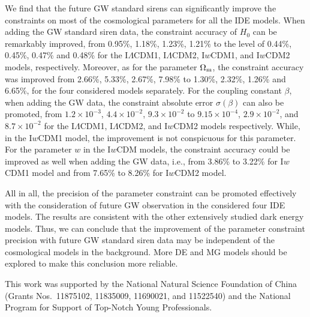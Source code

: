 \documentclass[aps,prd,nofootinbib,amsmath,amssymb,superscriptaddress,twocolumn,10pt]{revtex4}%
\begin{document}
We find that the future GW standard sirens can significantly improve the constraints on most of the cosmological parameters for all the IDE models. When adding the GW standard siren data, the constraint accuracy of $H_0$ can be remarkably improved, from 0.95\%, 1.18\%, 1.23\%, 1.21\% to the level of 0.44\%, 0.45\%, 0.47\% and 0.48\% for the I$\Lambda$CDM1, I$\Lambda$CDM2, I$w$CDM1, and I$w$CDM2 models, respectively. Moreover, as for the parameter $\Omega_{\rm m}$, the constraint accuracy was improved from 2.66\%, 5.33\%, 2.67\%, 7.98\% to 1.30\%, 2.32\%, 1.26\% and 6.65\%, for the four considered models separately. For the coupling constant $\beta$, when adding the GW data, the constraint absolute error $\sigma(\beta)$ can also be promoted, from $1.2 \times 10^{-3}$, $4.4 \times 10^{-2}$, $9.3 \times 10^{-2}$ to $9.15 \times 10^{-4}$, $2.9 \times 10^{-2}$, and $8.7 \times 10^{-2}$ for the I$\Lambda$CDM1, I$\Lambda$CDM2, and I$w$CDM2 models respectively. While, in the I$w$CDM1 model, the improvement is not conspicuous for this parameter. For the parameter $w$ in the I$w$CDM models, the constraint accuracy could be improved as well when adding the GW data, i.e., from 3.86\% to 3.22\% for I$w$CDM1 model and from 7.65\% to 8.26\% for I$w$CDM2 model.

All in all, the precision of the parameter constraint can be promoted effectively with the consideration of future GW observation in the considered four IDE models. The results are consistent with the other extensively studied dark energy models. Thus, we can conclude that the improvement of the parameter constraint precision with future GW standard siren data may be independent of the cosmological models in the background. More DE and MG models should be explored to make this conclusion more reliable.

\begin{acknowledgments}
This work was supported by the National Natural Science Foundation of China (Grants Nos.~11875102, 11835009, 11690021, and 11522540) and the National Program for Support of Top-Notch Young Professionals.
\end{acknowledgments}
\end{document}
